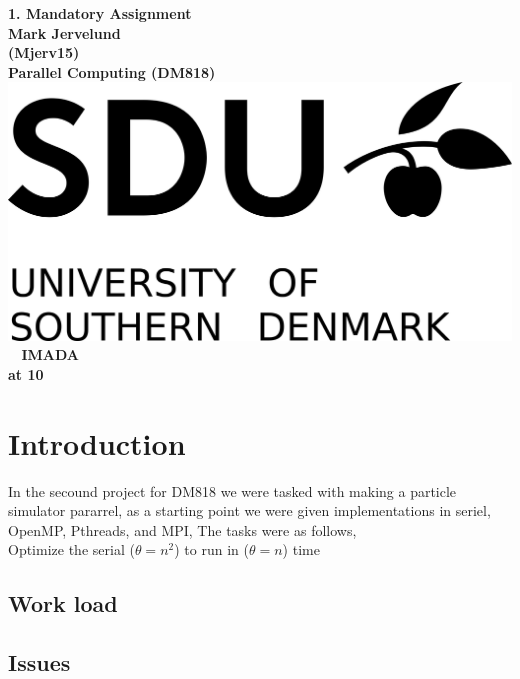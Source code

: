 \documentclass[a4paper,10pt,titlepage]{report}
\date{}
\begin{document}
\begin{titlepage}
\centering
    \vspace*{9\baselineskip}
    \huge
    \bfseries
    1. Mandatory Assignment \\
    \normalfont
    Mark Jervelund  \\
    (Mjerv15) \\
	\huge
    Parallel Computing (DM818)  \\[4\baselineskip]
    \normalfont
	\includegraphics[scale=1]{SDU_logo}
    \vfill\
    \vspace{5mm}
    IMADA \\

    \textbf{\datedate}  \bf{at 10} \\[2\baselineskip]
\end{titlepage}

\renewcommand{\thepage}{\roman{page}}%
\tableofcontents
\newpage
\setcounter{page}{1}
\renewcommand{\thepage}{\arabic{page}}


\section{Introduction}

In the secound project for DM818 we were tasked with making a particle simulator pararrel, as a starting point we were given implementations in seriel, OpenMP, Pthreads, and MPI, The tasks were as follows, \\

Optimize the serial ($ \theta = n^2$) to run in ($ \theta = n$) time


\subsection{Work load}


\subsection{Issues}
\end{document}
